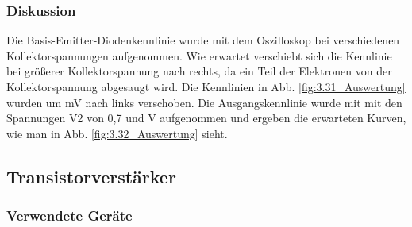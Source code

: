 \documentclass[12pt,a4paper]{article}
\begin{document}
\subsubsection{Diskussion}
Die Basis-Emitter-Diodenkennlinie wurde mit dem Oszilloskop bei verschiedenen Kollektorspannungen aufgenommen. Wie erwartet verschiebt sich die Kennlinie bei größerer Kollektorspannung nach rechts, da ein Teil der Elektronen von der Kollektorspannung abgesaugt wird. Die Kennlinien in Abb. \ref{fig:3.31_Auswertung} wurden um \unit[480]{mV} nach links verschoben. Die Ausgangskennlinie wurde mit mit den Spannungen V2 von 0,7 und \unit[0,8]{V} aufgenommen und ergeben die erwarteten Kurven, wie man in Abb. \ref{fig:3.32_Auswertung} sieht. 

\subsection{Transistorverstärker}
\subsubsection{Verwendete Geräte}
\end{document}
